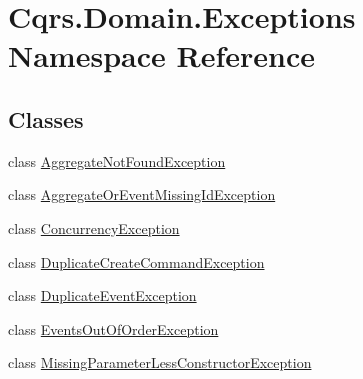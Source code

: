 \hypertarget{namespaceCqrs_1_1Domain_1_1Exceptions}{}\section{Cqrs.\+Domain.\+Exceptions Namespace Reference}
\label{namespaceCqrs_1_1Domain_1_1Exceptions}
\subsection*{Classes}
\begin{DoxyCompactItemize}
\item 
class \hyperlink{classCqrs_1_1Domain_1_1Exceptions_1_1AggregateNotFoundException}{Aggregate\+Not\+Found\+Exception}
\item 
class \hyperlink{classCqrs_1_1Domain_1_1Exceptions_1_1AggregateOrEventMissingIdException}{Aggregate\+Or\+Event\+Missing\+Id\+Exception}
\item 
class \hyperlink{classCqrs_1_1Domain_1_1Exceptions_1_1ConcurrencyException}{Concurrency\+Exception}
\item 
class \hyperlink{classCqrs_1_1Domain_1_1Exceptions_1_1DuplicateCreateCommandException}{Duplicate\+Create\+Command\+Exception}
\item 
class \hyperlink{classCqrs_1_1Domain_1_1Exceptions_1_1DuplicateEventException}{Duplicate\+Event\+Exception}
\item 
class \hyperlink{classCqrs_1_1Domain_1_1Exceptions_1_1EventsOutOfOrderException}{Events\+Out\+Of\+Order\+Exception}
\item 
class \hyperlink{classCqrs_1_1Domain_1_1Exceptions_1_1MissingParameterLessConstructorException}{Missing\+Parameter\+Less\+Constructor\+Exception}
\end{DoxyCompactItemize}
